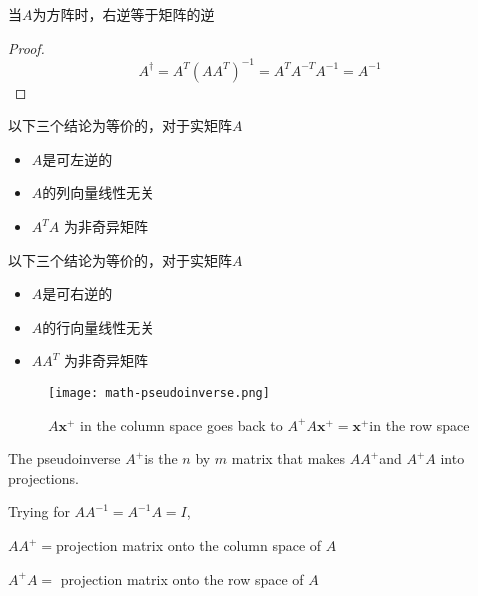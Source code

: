 \begin{theorem}
    当$A$为方阵时，右逆等于矩阵的逆
\end{theorem}

\begin{proof}
    $$ A^{\dagger}=A^{T}\left(A A^{T}\right)^{-1}=A^{T} A^{-T} A^{-1}=A^{-1} $$
\end{proof}

\begin{corollary}
    以下三个结论为等价的，对于实矩阵$A$

    \begin{itemize}
        \item $A$是可左逆的
        \item $A$的列向量线性无关
        \item $ A^{T} A $ 为非奇异矩阵
    \end{itemize}
\end{corollary}

\begin{corollary}
    以下三个结论为等价的，对于实矩阵$A$

    \begin{itemize}
        \item $A$是可右逆的 
        \item $A$的行向量线性无关
        \item $ A A^{T} $ 为非奇异矩阵
    \end{itemize}
\end{corollary}

\begin{figure}
    \caption{$ A \boldsymbol{x}^{+} $ in the column space goes back to $ A^{+} A \boldsymbol{x}^{+}=\boldsymbol{x}^{+} $in the row space}
    \texttt{[image: math-pseudoinverse.png]}
\end{figure}

The pseudoinverse $ A^{+} $is the $ n $ by $ m $ matrix that makes $ A A^{+} $and $ A^{+} A $ into projections. 

Trying for $ A A^{-1}=A^{-1} A=I $, 

\begin{remark}
    $ A A^{+}= $projection matrix onto the column space of $ A $

    $ A^{+} A= $ projection matrix onto the row space of $ A $
\end{remark}